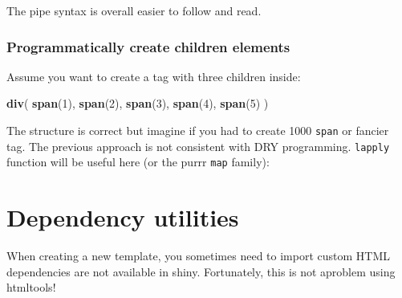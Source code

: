 \documentclass[]{book}
\newenvironment{Shaded}{\begin{snugshade}}{\end{snugshade}}
\newcommand{\CommentTok}[1]{\textcolor[rgb]{0.56,0.35,0.01}{\textit{#1}}}
\newcommand{\ControlFlowTok}[1]{\textcolor[rgb]{0.13,0.29,0.53}{\textbf{#1}}}
\newcommand{\DecValTok}[1]{\textcolor[rgb]{0.00,0.00,0.81}{#1}}
\newcommand{\KeywordTok}[1]{\textcolor[rgb]{0.13,0.29,0.53}{\textbf{#1}}}
\newcommand{\NormalTok}[1]{#1}
\newcommand{\OperatorTok}[1]{\textcolor[rgb]{0.81,0.36,0.00}{\textbf{#1}}}
\newcommand{\StringTok}[1]{\textcolor[rgb]{0.31,0.60,0.02}{#1}}
\begin{document}
The pipe syntax is overall easier to follow and read.

\hypertarget{programmatically-create-children-elements}{%
\subsection{Programmatically create children elements}\label{programmatically-create-children-elements}}

Assume you want to create a tag with three children inside:

\begin{Shaded}
\begin{Highlighting}[]
\KeywordTok{div}\NormalTok{(}
  \KeywordTok{span}\NormalTok{(}\DecValTok{1}\NormalTok{),}
  \KeywordTok{span}\NormalTok{(}\DecValTok{2}\NormalTok{),}
  \KeywordTok{span}\NormalTok{(}\DecValTok{3}\NormalTok{),}
  \KeywordTok{span}\NormalTok{(}\DecValTok{4}\NormalTok{),}
  \KeywordTok{span}\NormalTok{(}\DecValTok{5}\NormalTok{)}
\NormalTok{)}
\end{Highlighting}
\end{Shaded}

The structure is correct but imagine if you had to create 1000 \texttt{span} or fancier tag. The previous approach is not consistent with DRY programming. \texttt{lapply} function will be useful here (or the purrr \texttt{map} family):

\begin{Shaded}
\end{Shaded}

\hypertarget{htmltools-dependencies}{%
\chapter{Dependency utilities}\label{htmltools-dependencies}}

When creating a new template, you sometimes need to import custom HTML dependencies
are not available in shiny. Fortunately, this is not aproblem using htmltools!
\end{document}
